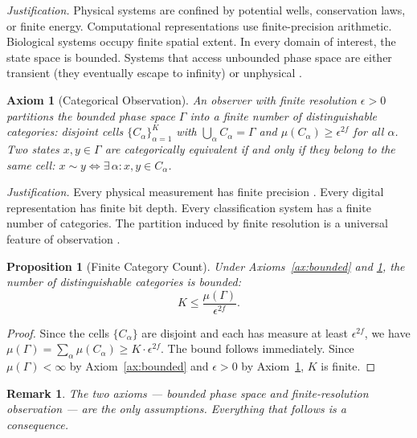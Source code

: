 \documentclass[11pt,twocolumn,a4paper]{article}
\newtheorem{proposition}[theorem]{Proposition}
\newtheorem{remark}[theorem]{Remark}
\newtheorem{axiom}{Axiom}
\begin{document}
\noindent
\textit{Justification.} Physical systems are confined by potential
wells, conservation laws, or finite energy. Computational
representations use finite-precision arithmetic. Biological systems
occupy finite spatial extent. In every domain of interest, the state
space is bounded. Systems that access unbounded phase space are either
transient (they eventually escape to infinity) or unphysical
\citep{goldstein2002,arnoldavez1968}.

\begin{axiom}[Categorical Observation]
\label{ax:categorical}
An observer with finite resolution $\epsilon > 0$ partitions the
bounded phase space $\Gamma$ into a finite number of distinguishable
\emph{categories}: disjoint cells $\{C_\alpha\}_{\alpha=1}^{K}$ with
$\bigcup_\alpha C_\alpha = \Gamma$ and $\mu(C_\alpha) \geq
\epsilon^{2f}$ for all $\alpha$. Two states $x, y \in \Gamma$ are
\emph{categorically equivalent} if and only if they belong to the same
cell: $x \sim y \iff \exists\,\alpha : x,y \in C_\alpha$.
\end{axiom}

\noindent
\textit{Justification.} Every physical measurement has finite
precision \citep{heisenberg1927}. Every digital representation has
finite bit depth. Every classification system has a finite number of
categories. The partition induced by finite resolution is a universal
feature of observation \citep{vonneumann1932}.

\begin{proposition}[Finite Category Count]
\label{prop:finite-categories}
Under Axioms~\ref{ax:bounded} and \ref{ax:categorical}, the number
of distinguishable categories is bounded:
\begin{equation}
K \leq \frac{\mu(\Gamma)}{\epsilon^{2f}}.
\label{eq:finite-K}
\end{equation}
\end{proposition}

\begin{proof}
Since the cells $\{C_\alpha\}$ are disjoint and each has measure at
least $\epsilon^{2f}$, we have $\mu(\Gamma) = \sum_\alpha
\mu(C_\alpha) \geq K \cdot \epsilon^{2f}$. The bound follows
immediately. Since $\mu(\Gamma) < \infty$ by Axiom~\ref{ax:bounded}
and $\epsilon > 0$ by Axiom~\ref{ax:categorical}, $K$ is finite.
\end{proof}

\begin{remark}
The two axioms --- bounded phase space and finite-resolution
observation --- are the only assumptions. Everything that follows is
a consequence.
\end{remark}
\end{document}
